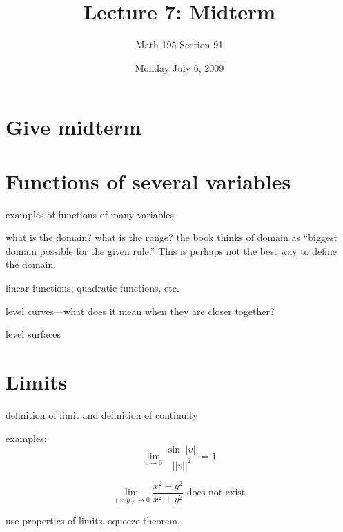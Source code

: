 \documentclass[12pt]{article}
\title{Lecture 7: Midterm}
\author{Math 195 Section 91}
\date{Monday July  6, 2009}
\begin{document}
\maketitle

\section{Give midterm}

\section{Functions of several variables}

examples of functions of many variables

what is the domain?  what is the range?  the book thinks of domain as
``biggest domain possible for the given rule.''  This is perhaps not
the best way to define the domain.

linear functions; quadratic functions, etc.

level curves---what does it mean when they are closer together?

level surfaces

\section{Limits}

definition of limit and definition of continuity

examples:
$$
\lim_{v \to 0} \frac{\sin ||v||}{||v||^2} = 1
$$

$$
\lim_{(x,y) \to 0} \frac{x^2 - y^2}{x^2 + y^2} \mbox{ does not exist.}
$$

use properties of limits, squeeze theorem, 
\end{document}
